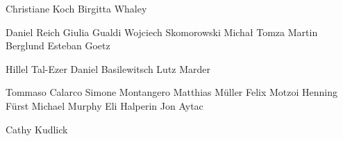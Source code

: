 
Christiane Koch
Birgitta Whaley

Daniel Reich
Giulia Gualdi
Wojciech Skomorowski
Michał Tomza
Martin Berglund
Esteban Goetz

Hillel Tal-Ezer
Daniel Basilewitsch
Lutz Marder


Tommaso Calarco
Simone Montangero
Matthias Müller
Felix Motzoi
Henning Fürst
Michael Murphy
Eli Halperin
Jon Aytac

Cathy Kudlick
